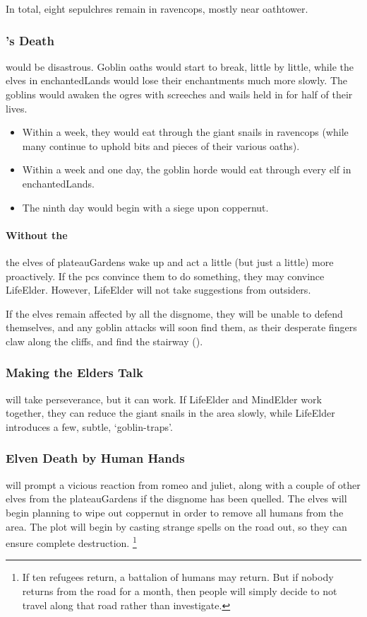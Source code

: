 \begin{multicols}{2}
In total, eight \glspl{sepulchre} remain in \gls{ravencops}, mostly near \gls{oathtower}.

\subsubsection{'s Death}
would be disastrous.
Goblin oaths would start to break, little by little, while the elves in \gls{enchantedLands} would lose their enchantments much more slowly.
The goblins would awaken the \glspl{ogre} with screeches and wails held in for half of their lives.

\begin{itemize}
  \item
  Within a week, they would eat through the giant snails in \gls{ravencops} (while many continue to uphold bits and pieces of their various oaths).
  \item
  Within a week and one day, the goblin horde would eat through every elf in \gls{enchantedLands}.
  \item
  The ninth day would begin with a siege upon \gls{coppernut}.
\end{itemize}

\paragraph{Without the }
the elves of \gls{plateauGardens} wake up and act a little (but just a little) more proactively.
If the \glspl{pc} convince them to do something, they may convince \gls{LifeElder}.
However, \gls{LifeElder} will not take suggestions from outsiders.

If the elves remain affected by all the \gls{disgnome}, they will be unable to defend themselves, and any goblin attacks will soon find them, as their desperate fingers claw along the cliffs, and find the stairway ().

\subsubsection{Making the Elders Talk}
will take perseverance, but it can work.
If \gls{LifeElder} and \gls{MindElder} work together, they can  reduce the giant snails in the area slowly, while \gls{LifeElder} introduces a few, subtle, `goblin-traps'.

\subsubsection{Elven Death by Human Hands}
will prompt a vicious reaction from \gls{romeo} and \gls{juliet}, along with a couple of other elves from the \gls{plateauGardens} if the \gls{disgnome} has been quelled.
The elves will begin planning to wipe out \gls{coppernut} in order to remove all humans from the area.
The plot will begin by casting strange spells on the road out, so they can ensure complete destruction.%
\footnote{If ten refugees return, a battalion of humans may return.
But if nobody returns from the road for a month, then people will simply decide to not travel along that road rather than investigate.}


\end{multicols}
